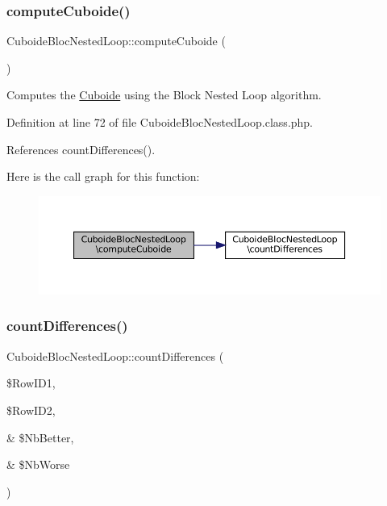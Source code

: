 \subsubsection{\texorpdfstring{compute\+Cuboide()}{computeCuboide()}}
{\footnotesize\ttfamily Cuboide\+Bloc\+Nested\+Loop\+::compute\+Cuboide (\begin{DoxyParamCaption}{ }\end{DoxyParamCaption})}

Computes the \hyperlink{class_cuboide}{Cuboide} using the Block Nested Loop algorithm. 

Definition at line 72 of file Cuboide\+Bloc\+Nested\+Loop.\+class.\+php.



References count\+Differences().

Here is the call graph for this function\+:\nopagebreak
\begin{figure}[H]
\begin{center}
\leavevmode
\includegraphics[width=350pt]{class_cuboide_bloc_nested_loop_acee44f594a7c62bf10098f7e488ee7a4_cgraph}
\end{center}
\end{figure}
\mbox{\label{class_cuboide_bloc_nested_loop_ac403846d4983ce29b9d3a8f3f8cb2e5f}} 
\subsubsection{\texorpdfstring{count\+Differences()}{countDifferences()}}
{\footnotesize\ttfamily Cuboide\+Bloc\+Nested\+Loop\+::count\+Differences (\begin{DoxyParamCaption}\item[{}]{\$\+Row\+I\+D1,  }\item[{}]{\$\+Row\+I\+D2,  }\item[{\&}]{\$\+Nb\+Better,  }\item[{\&}]{\$\+Nb\+Worse }\end{DoxyParamCaption})\hspace{0.3cm}{\ttfamily [protected]}}

